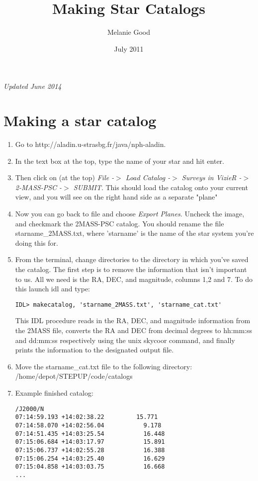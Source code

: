 \documentclass[10pt,preprint]{aastex}
\begin{document}
\title{Making Star Catalogs}
\author{Melanie Good}
\date{July 2011}

\emph{Updated June 2014}

\section{Making a star catalog}

\begin{enumerate}
\item Go to http://aladin.u-strasbg.fr/java/nph-aladin.
\item In the text box at the top, type the name of your star and hit enter.
\item Then click on (at the top) \emph{File -$>$ Load Catalog -$>$ Surveys in VizieR -$>$ 2-MASS-PSC -$>$ SUBMIT}. This should load the catalog onto your current view, and you will see on the right hand side as a separate "plane"
\item Now you can go back to file and choose \emph{Export Planes}. Uncheck the image, and checkmark the 2MASS-PSC catalog. You should rename the file starname\_2MASS.txt, where 'starname' is the name of the star system you're doing this for.
\item From the terminal, change directories to the directory in which you've saved the catalog. The first step is to remove the information that isn't important to us. All we need is the RA, DEC, and magnitude, columns 1,2 and 7. To do this launch idl and type:
\begin{verbatim}
IDL> makecatalog, 'starname_2MASS.txt', 'starname_cat.txt'
\end{verbatim}
This IDL procedure reads in the RA, DEC, and magnitude information from the 2MASS file, converts the RA and DEC from decimal degrees to hh:mm:ss and dd:mm:ss respectively using the unix skycoor command, and finally prints the information to the designated output file.
\item Move the starname\_cat.txt file to the following directory: /home/depot/STEPUP/code/catalogs
\item Example finished catalog:
\begin{verbatim}
/J2000/N
07:14:59.193 +14:02:38.22         15.771
07:14:58.070 +14:02:56.04	        9.178
07:14:51.435 +14:03:25.54	        16.448
07:15:06.684 +14:03:17.97	        15.891
07:15:06.737 +14:02:55.28	        16.388
07:15:06.254 +14:03:25.40	        16.629
07:15:04.858 +14:03:03.75	        16.668
...
\end{verbatim}
\end{enumerate}
\end{document}
